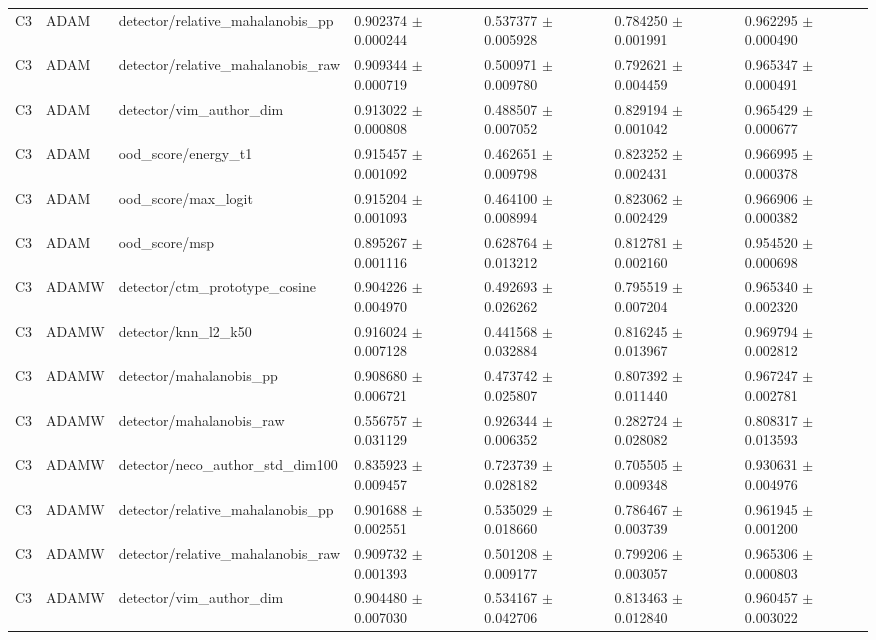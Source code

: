 \begin{longtable}{lllllll}
C3 & ADAM & detector/relative\_mahalanobis\_pp & 0.902374 $\pm$ 0.000244 & 0.537377 $\pm$ 0.005928 & 0.784250 $\pm$ 0.001991 & 0.962295 $\pm$ 0.000490 \\
C3 & ADAM & detector/relative\_mahalanobis\_raw & 0.909344 $\pm$ 0.000719 & 0.500971 $\pm$ 0.009780 & 0.792621 $\pm$ 0.004459 & 0.965347 $\pm$ 0.000491 \\
C3 & ADAM & detector/vim\_author\_dim & 0.913022 $\pm$ 0.000808 & 0.488507 $\pm$ 0.007052 & 0.829194 $\pm$ 0.001042 & 0.965429 $\pm$ 0.000677 \\
C3 & ADAM & ood\_score/energy\_t1 & 0.915457 $\pm$ 0.001092 & 0.462651 $\pm$ 0.009798 & 0.823252 $\pm$ 0.002431 & 0.966995 $\pm$ 0.000378 \\
C3 & ADAM & ood\_score/max\_logit & 0.915204 $\pm$ 0.001093 & 0.464100 $\pm$ 0.008994 & 0.823062 $\pm$ 0.002429 & 0.966906 $\pm$ 0.000382 \\
C3 & ADAM & ood\_score/msp & 0.895267 $\pm$ 0.001116 & 0.628764 $\pm$ 0.013212 & 0.812781 $\pm$ 0.002160 & 0.954520 $\pm$ 0.000698 \\
C3 & ADAMW & detector/ctm\_prototype\_cosine & 0.904226 $\pm$ 0.004970 & 0.492693 $\pm$ 0.026262 & 0.795519 $\pm$ 0.007204 & 0.965340 $\pm$ 0.002320 \\
C3 & ADAMW & detector/knn\_l2\_k50 & 0.916024 $\pm$ 0.007128 & 0.441568 $\pm$ 0.032884 & 0.816245 $\pm$ 0.013967 & 0.969794 $\pm$ 0.002812 \\
C3 & ADAMW & detector/mahalanobis\_pp & 0.908680 $\pm$ 0.006721 & 0.473742 $\pm$ 0.025807 & 0.807392 $\pm$ 0.011440 & 0.967247 $\pm$ 0.002781 \\
C3 & ADAMW & detector/mahalanobis\_raw & 0.556757 $\pm$ 0.031129 & 0.926344 $\pm$ 0.006352 & 0.282724 $\pm$ 0.028082 & 0.808317 $\pm$ 0.013593 \\
C3 & ADAMW & detector/neco\_author\_std\_dim100 & 0.835923 $\pm$ 0.009457 & 0.723739 $\pm$ 0.028182 & 0.705505 $\pm$ 0.009348 & 0.930631 $\pm$ 0.004976 \\
C3 & ADAMW & detector/relative\_mahalanobis\_pp & 0.901688 $\pm$ 0.002551 & 0.535029 $\pm$ 0.018660 & 0.786467 $\pm$ 0.003739 & 0.961945 $\pm$ 0.001200 \\
C3 & ADAMW & detector/relative\_mahalanobis\_raw & 0.909732 $\pm$ 0.001393 & 0.501208 $\pm$ 0.009177 & 0.799206 $\pm$ 0.003057 & 0.965306 $\pm$ 0.000803 \\
C3 & ADAMW & detector/vim\_author\_dim & 0.904480 $\pm$ 0.007030 & 0.534167 $\pm$ 0.042706 & 0.813463 $\pm$ 0.012840 & 0.960457 $\pm$ 0.003022 \\

\end{longtable}
